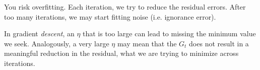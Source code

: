 \documentclass[12pt]{article}
\begin{document}
\begin{enumerate}

You risk overfitting. Each iteration, we try to reduce the residual errors.
After too many iterations, we may start fitting noise (i.e. ignorance error).


In gradient \textit{descent}, an $\eta$ that is too  large can lead to missing the
minimum value we seek. Analogously, a very large $\eta$ may mean that the
$G_t$ does not result in a meaningful reduction in the residual, what we
are trying to minimize across iterations.

\end{enumerate}
\end{document}
